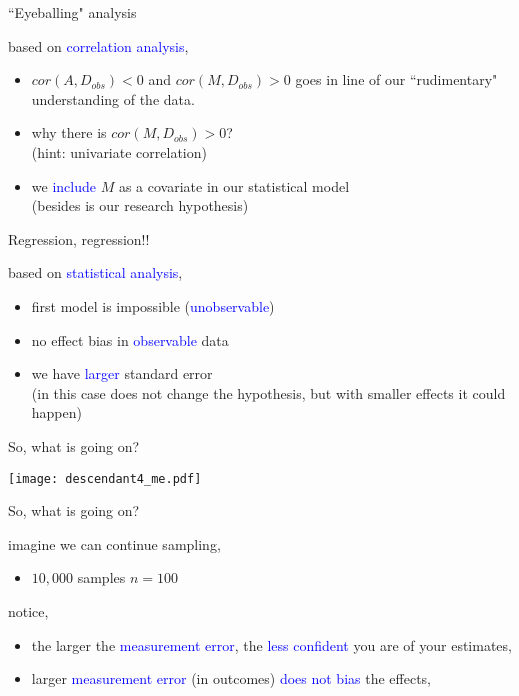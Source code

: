 %
%
\begin{lhframe}[rhgraphic={\texttt{[image: descendant4\_panel.pdf]}}]
	{``Eyeballing" analysis}
	
	based on \textcolor{blue}{correlation analysis},
	\begin{itemize}
		\item $cor(A, D_{obs})<0$ and $cor(M, D_{obs})>0$
		goes in line of our ``rudimentary" understanding of the data.
		\item why there is $cor(M, D_{obs})>0$? \\
		{\small (hint: univariate correlation)}
		\item we \textcolor{blue}{include} $M$ as a covariate in our statistical model \\
		{\small (besides is our research hypothesis)}
	\end{itemize}
\end{lhframe}
%
%
\begin{lhframe}[rhgraphic={\texttt{[image: descendant4\_reg.png]}}]
	{Regression, regression!!}
	
	based on \textcolor{blue}{statistical analysis},
	\begin{itemize}
		\item first model is impossible (\textcolor{blue}{unobservable})
		\item no effect bias in \textcolor{blue}{observable} data
		\item we have \textcolor{blue}{larger} standard error \\
		{\small (in this case does not change the hypothesis, but with smaller effects it could happen)}
	\end{itemize}
\end{lhframe}
%
%
\begin{frame}
	{So, what is going on?}
	
	\begin{figure*}
		\texttt{[image: descendant4\_me.pdf]}
	\end{figure*}
\end{frame}
%
%
\begin{lhframe}[rhgraphic={\texttt{[image: descendant4\_samplesize.pdf]}}]
	{So, what is going on?}
	
	imagine we can continue sampling,
	\begin{itemize}
		\item $10,000$ samples $n=100$
	\end{itemize}
	
	notice,
	\begin{itemize}
		\item the larger the \textcolor{blue}{measurement error}, the \textcolor{blue}{less confident} you are of your estimates,
		\item larger \textcolor{blue}{measurement error} (in outcomes) \textcolor{blue}{does not bias} the effects, 
	\end{itemize}
\end{lhframe}
